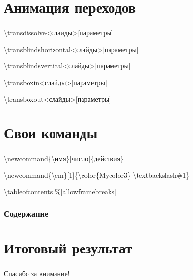 \documentclass[russian, 14pt]{beamer}
\newcommand{\cm}[1]{{\color{Mycolor3}\textbackslash#1}}
\begin{document}
\section{Анимация переходов}

\begin{frame}
	\frametitle{\insertsection}
	\begin{block}{}
		\cm{transdissolve}<слайды>[параметры]
		
		
		\cm{transblindshorizontal}<слайды>[параметры]
		
		
		\cm{transblindsvertical}<слайды>[параметры]
		
		
		\cm{transboxin}<слайды>[параметры]
		
		
		\cm{transboxout}<слайды>[параметры]
	\end{block}
\end{frame}

\section{Свои команды}

\begin{frame}
	\frametitle{\insertsection}
	\begin{block}{}
		\cm{newcommand}\{\textbackslash имя\}[число]\{действия\}
	\end{block}
	\begin{block}{}
		\cm{newcommand}\{\textbackslash cm\}[1]\{\cm{color}\{Mycolor3\}
		\cm{textbackslash}\#1\}
	\end{block}
\end{frame}

\begin{frame}[allowframebreaks]{}
	\begin{block}{}
		\cm{tableofcontents} \%[allowframebreaks]
	\end{block}
	\frametitle{Содержание}
	\tableofcontents
\end{frame}

\section{Итоговый результат}

\begin{frame}
	\frametitle{\insertsection}
\end{frame}

\begin{frame}
	\centering
	\LARGE{Спасибо за внимание!}
\end{frame}
\end{document}
